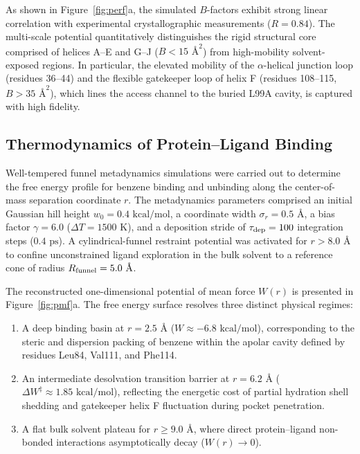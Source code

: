 \documentclass[journal=jpcbfk,manuscript=article,layout=twocolumn]{achemso}
\begin{document}
As shown in Figure~\ref{fig:perf}a, the simulated $B$-factors exhibit strong linear correlation with experimental crystallographic measurements ($R = 0.84$). The multi-scale potential quantitatively distinguishes the rigid structural core comprised of helices A--E and G--J ($B < 15\text{ \AA}^2$) from high-mobility solvent-exposed regions. In particular, the elevated mobility of the $\alpha$-helical junction loop (residues 36--44) and the flexible gatekeeper loop of helix F (residues 108--115, $B > 35\text{ \AA}^2$), which lines the access channel to the buried L99A cavity, is captured with high fidelity.

\subsection{Thermodynamics of Protein--Ligand Binding}
Well-tempered funnel metadynamics simulations were carried out to determine the free energy profile for benzene binding and unbinding along the center-of-mass separation coordinate $r$. The metadynamics parameters comprised an initial Gaussian hill height $w_0 = 0.4\text{ kcal/mol}$, a coordinate width $\sigma_r = 0.5\text{ \AA}$, a bias factor $\gamma = 6.0$ ($\Delta T = 1500\text{ K}$), and a deposition stride of $\tau_{\rm dep} = 100$ integration steps ($0.4\text{ ps}$). A cylindrical-funnel restraint potential was activated for $r > 8.0\text{ \AA}$ to confine unconstrained ligand exploration in the bulk solvent to a reference cone of radius $R_{\rm funnel} = 5.0\text{ \AA}$.

The reconstructed one-dimensional potential of mean force $W(r)$ is presented in Figure~\ref{fig:pmf}a. The free energy surface resolves three distinct physical regimes:
\begin{enumerate}
\item A deep binding basin at $r = 2.5\text{ \AA}$ ($W \approx -6.8\text{ kcal/mol}$), corresponding to the steric and dispersion packing of benzene within the apolar cavity defined by residues Leu84, Val111, and Phe114.
\item An intermediate desolvation transition barrier at $r = 6.2\text{ \AA}$ ($\Delta W^\ddagger \approx 1.85\text{ kcal/mol}$), reflecting the energetic cost of partial hydration shell shedding and gatekeeper helix F fluctuation during pocket penetration.
\item A flat bulk solvent plateau for $r \ge 9.0\text{ \AA}$, where direct protein--ligand non-bonded interactions asymptotically decay ($W(r) \to 0$).
\end{enumerate}
\end{document}
